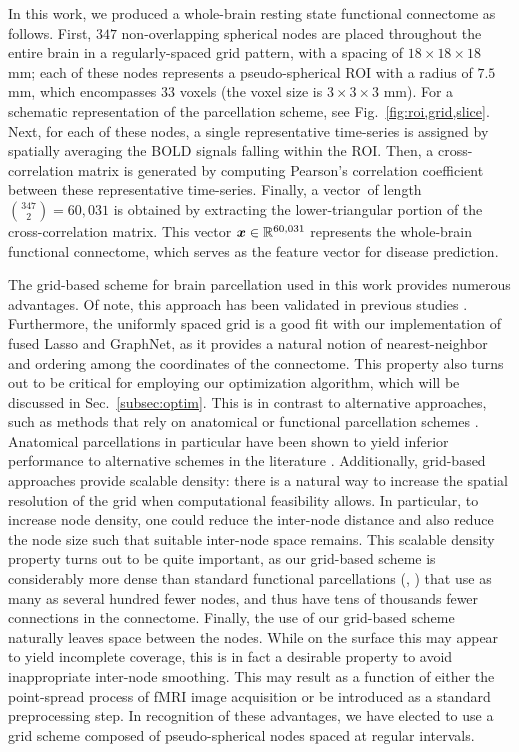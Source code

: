 In this work, we produced a whole-brain resting state functional connectome as follows.
First, $347$ non-overlapping spherical nodes are placed throughout the entire brain in a regularly-spaced grid pattern, with a spacing of $18\times 18 \times 18$ mm; each of these nodes represents a pseudo-spherical ROI with a radius of $7.5$ mm, which encompasses $33$ voxels (the voxel size is $3\times 3\times 3$ mm).
For a schematic representation of the parcellation scheme, see Fig.~\ref{fig:roi,grid,slice}.
Next, for each of these nodes, a single representative time-series is assigned by spatially averaging the BOLD signals falling within the ROI.
Then, a cross-correlation matrix is generated by computing Pearson's correlation coefficient between these representative time-series.
Finally, a vector~\x of length $\binom{347}{2}=60,031$ is obtained by extracting the lower-triangular portion of the cross-correlation matrix.
This vector ${\bm{x}}\in\mathbb{R}^{60,031}$ represents the whole-brain functional connectome, which serves as the feature vector for disease prediction.

The grid-based scheme for brain parcellation used in this work provides numerous advantages. 
Of note, this approach has been validated in previous studies \citep{Sripada:2013,Sripada:2013b,Sripada:2014}. 
Furthermore, the uniformly spaced grid is a good fit with our implementation of fused Lasso and GraphNet, as it provides a natural notion of nearest-neighbor and ordering among the coordinates of the connectome. 
This property also turns out to be critical for employing our optimization algorithm, which will be discussed in Sec.~\ref{subsec:optim}. 
This is in contrast to alternative approaches, such as methods that rely on anatomical \citep{AAL:2002,Zeng:2012} or functional parcellation schemes \citep{Dosenbach:2010}. 
Anatomical parcellations in particular have been shown to yield inferior performance to alternative schemes in the literature \citep{Power:2011}. 
Additionally, grid-based approaches provide scalable density: there is a natural way to increase the spatial resolution of the grid when computational feasibility allows. 
In particular, to increase node density, one could reduce the inter-node distance and also reduce the node size such that suitable inter-node space remains. 
This scalable density property turns out to be quite important, as our grid-based scheme is considerably more dense than standard functional parcellations (\eg, \cite{Dosenbach:2010, Shirer:2011}) that use as many as several hundred fewer nodes, and thus have tens of thousands fewer connections in the connectome.  
Finally, the use of our grid-based scheme naturally leaves space between the nodes. 
While on the surface this may appear to yield incomplete coverage, this is in fact a desirable property to avoid inappropriate inter-node smoothing. 
This may result as a function of either the point-spread process of fMRI image acquisition or be introduced as a standard preprocessing step. 
In recognition of these advantages, we have elected to use a grid scheme composed of pseudo-spherical nodes spaced at regular intervals.

